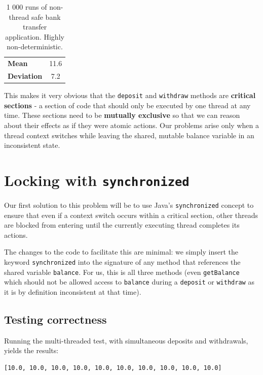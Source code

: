 \documentclass[a4paper,12pt]{kth-mag}
\begin{document}
\begin{table}[h]
    \centering
    \begin{tabular}{l | c}    
    \textbf{Mean} & 11.6 \\
    \textbf{Deviation} & 7.2 \\ 
    \end{tabular}
    \caption{1 000 runs of non-thread safe bank transfer application. Highly non-deterministic.}
\end{table}

This makes it very obvious that the \texttt{deposit} and \texttt{withdraw} methods are \textbf{critical sections} - a section of code that should only be executed by one thread at any time. These sections need to be \textbf{mutually exclusive} so that we can reason about their effects as if they were atomic actions. Our problems arise only when a thread context switches while leaving the shared, mutable balance variable in an inconsistent state. 

\section{Locking with \texttt{synchronized}}

Our first solution to this problem will be to use Java's \texttt{synchronized} concept to ensure that even if a context switch occurs within a critical section, other threads are blocked from entering until the currently executing thread completes its actions.

The changes to the code to facilitate this are minimal: we simply insert the keyword \texttt{synchronized} into the signature of any method that references the shared variable \texttt{balance}. For us, this is all three methods (even \texttt{getBalance} which should not be allowed access to \texttt{balance} during a \texttt{deposit} or \texttt{withdraw} as it is by definition inconsistent at that time).

\subsection{Testing correctness}

Running the multi-threaded test, with simultaneous deposits and withdrawals, yields the results:

\begin{listing}[H]
	\begin{verbatim}
[10.0, 10.0, 10.0, 10.0, 10.0, 10.0, 10.0, 10.0, 10.0, 10.0] 
	\end{verbatim}
\end{listing}
\end{document}
